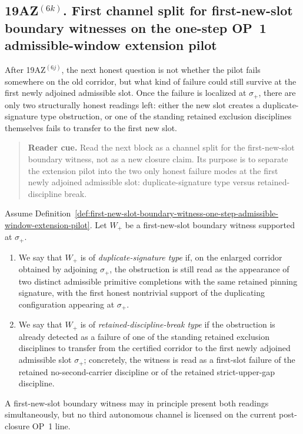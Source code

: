 \subsection*{19AZ$^{(6k)}$. First channel split for first-new-slot boundary witnesses on the one-step OP~1 admissible-window extension pilot}
\label{sec:first-channel-split-first-new-slot-boundary-witnesses-one-step-op1-pilot}
After 19AZ$^{(6j)}$, the next honest question is not whether the pilot fails somewhere on the old corridor, but what kind of failure could still survive at the first newly adjoined admissible slot. Once the failure is localized at $\sigma_{+}$, there are only two structurally honest readings left: either the new slot creates a duplicate-signature type obstruction, or one of the standing retained exclusion disciplines themselves fails to transfer to the first new slot.

\begin{quote}\small
\noindent\textbf{Reader cue.} Read the next block as a channel split for the first-new-slot boundary witness, not as a new closure claim. Its purpose is to separate the extension pilot into the two only honest failure modes at the first newly adjoined admissible slot: duplicate-signature type versus retained-discipline break.
\end{quote}

\begin{definition}
\label{def:duplicate-signature-vs-retained-discipline-break-first-new-slot-op1-pilot}
Assume Definition~\ref{def:first-new-slot-boundary-witness-one-step-admissible-window-extension-pilot}. Let $W_{+}$ be a first-new-slot boundary witness supported at $\sigma_{+}$.
\begin{enumerate}[leftmargin=2em,label=(\roman*)]
  \item We say that $W_{+}$ is of \emph{duplicate-signature type} if, on the enlarged corridor obtained by adjoining $\sigma_{+}$, the obstruction is still read as the appearance of two distinct admissible primitive completions with the same retained pinning signature, with the first honest nontrivial support of the duplicating configuration appearing at $\sigma_{+}$.
  \item We say that $W_{+}$ is of \emph{retained-discipline-break type} if the obstruction is already detected as a failure of one of the standing retained exclusion disciplines to transfer from the certified corridor to the first newly adjoined admissible slot $\sigma_{+}$; concretely, the witness is read as a first-slot failure of the retained no-second-carrier discipline or of the retained strict-upper-gap discipline.
\end{enumerate}
A first-new-slot boundary witness may in principle present both readings simultaneously, but no third autonomous channel is licensed on the current post-closure OP~1 line.
\end{definition}

